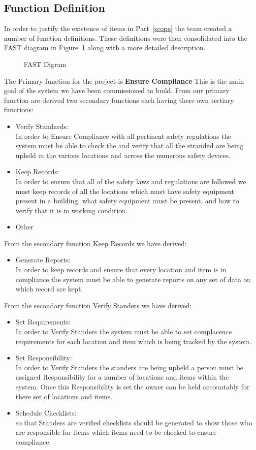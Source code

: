 \documentclass[Letter,11pt]{article}
\begin{document}
	\subsection{Function Definition} 
		In order to justify the existence of items in Part~\ref{scope} the team created a number of function definitions. These definitions were then consolidated into the FAST diagram in Figure~\ref{fast1} along with a more detailed description.
		\begin{figure}[h]
			\centering
			
			\caption{\label{fast1} FAST Digram}
		\end{figure}
		The Primary function for the project is \textbf{Ensure Compliance} This is the main goal of the system we have been commissioned to build. From our primary function are derived two secondary functions each having there own tertiary functions:
		\begin{itemize}
			\item Verify Standards:\\
			In order to Ensure Compliance with all pertinent safety regulations the system must be able to check the and verify that all the stranded are being upheld in the various locations and across the numerous safety devices.
			\item Keep Records:\\
			In order to ensure that all of the safety laws and regulations are followed we must keep records of all the locations which must have safety equipment present in a building, what safety equipment must be present, and how to verify that it is in working condition.  

			\item Other 
		\end{itemize}
		From the secondary function Keep Records we have derived: 
		\begin{itemize}
			\item Generate Reports:\\
			In order to keep records and ensure that every location and item is in compliance the system must be able to generate reports on any set of data on which record are kept. 
		\end{itemize}
		From the secondary function Verify Standers we have derived:
		\begin{itemize}
			\item Set Requirements:\\
			In order to Verify Standers the system must be able to set complacence requirements for each location and item which is being tracked by the system.
			\item Set Responsibility:\\
			In order to Verify Standers the standers are being upheld a person must be assigned Responsibility for a number of locations and items within the system. Once this Responsibility is set the owner can be held accountably for there set of locations and items. 
			\item Schedule Checklists:\\
			so that Standers are verified  checklists should be generated to show those who are responsible for items which items need to be checked to ensure compliance.
		\end{itemize}
		
\end{document}
